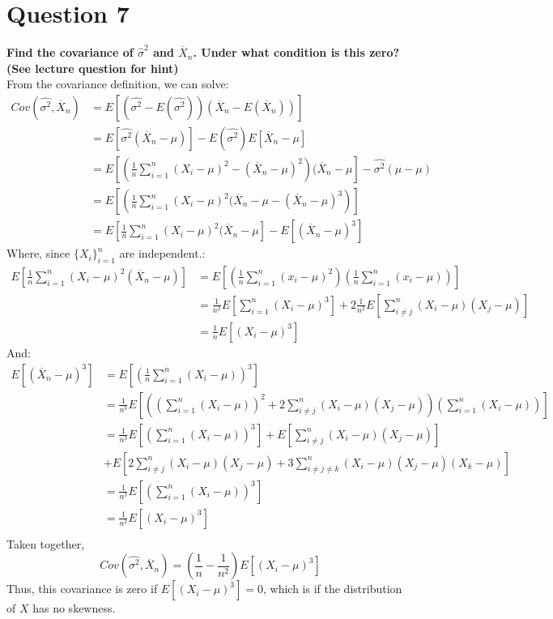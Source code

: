 \documentclass{article}
\newcommand{\olx}[1]{\overline{X}_{#1}}
\newcommand{\est}[1]{\frac{1}{#1}\sum_{i=1}^{#1}}
\begin{document}
\section*{Question 7}
\textbf{Find the covariance of $\hat{\sigma}^2$ and $\overline{X}_n$. Under what condition is this zero? (See lecture question for hint)}
\bigskip \\
From the covariance definition, we can solve:
\begin{align*}
	Cov(\hat{\sigma^2},\olx{n}) 
	&= E\left[(\hat{\sigma^2}-E(\hat{\sigma^2}))(\olx{n}-E(\olx{n}))\right]  \\
	&= E\left[\hat{\sigma^2}(\olx{n}-\mu)\right]  - E(\hat{\sigma^2})E\left[\olx{n}-\mu\right]   \\
	&= E\left[\left(\est{n}(X_i-\mu)^2-(\olx{n}-\mu)^2\right)(\olx{n}-\mu\right]  - \hat{\sigma^2}(\mu - \mu)   \\
	&= E\left[\left(\est{n}(X_i-\mu)^2(\olx{n}-\mu-(\olx{n}-\mu)^3\right)\right] \\
	&= E\left[\est{n}(X_i-\mu)^2(\olx{n}-\mu\right] - E\left[(\olx{n}-\mu)^3\right]
\end{align*}
Where, since $\{X_i\}_{i=1}^n$ are independent.:
\begin{align*}
	E\left[\est{n}(X_i-\mu)^2(\olx{n}-\mu)\right]
	&= E\left[\left(\est{n}(x_i-\mu)^2\right)\left(\est{n}(x_i-\mu)\right)\right] \\
	&= \frac{1}{n^2}E\left[\sum_{i=1}^n (X_i-\mu)^3\right] + 2\frac{1}{n^2}E\left[\sum_{i\neq j}^n(X_i - \mu)(X_j-\mu)\right] \\
	&= \frac{1}{n}E\left[(X_i-\mu)^3\right] 
\end{align*}
And:
\begin{align*}
	E\left[(\olx{n}-\mu)^3\right] &= E\left[\left(\est{n}(X_i-\mu)\right)^3\right] \\
	&= \frac{1}{n^3}E\left[\left(\left(\sum_{i=1}^n(X_i-\mu)\right)^2 + 2\sum_{i\neq j}^n(X_i-\mu)(X_j-\mu)\right)\left(\sum_{i=1}^n(X_i-\mu)\right)\right] \\
	&= \frac{1}{n^3}E\left[\left(\sum_{i=1}^n(X_i-\mu)\right)^3 \right] + E\left[\sum_{i\neq j}^n(X_i-\mu)(X_j-\mu)\right] \\
	&+ E\left[2\sum_{i\neq j}^n(X_i-\mu)(X_j-\mu)+ 3\sum_{i\neq j\neq k}^n(X_i-\mu)(X_j-\mu)(X_k-\mu)\right] \\
	&= \frac{1}{n^3}E\left[\left(\sum_{i=1}^n(X_i-\mu)\right)^3 \right] \\
	&= \frac{1}{n^2}E\left[(X_i-\mu)^3 \right] \\
\end{align*}
Taken together,
\[
	Cov(\hat{\sigma^2},\olx{n}) = \left(\frac{1}{n}-\frac{1}{n^2}\right)E[(X_i-\mu)^3]
\]
Thus, this covariance is zero if $E[(X_i-\mu)^3]=0$, which is if the distribution of $X$ has no skewness.
\end{document}

